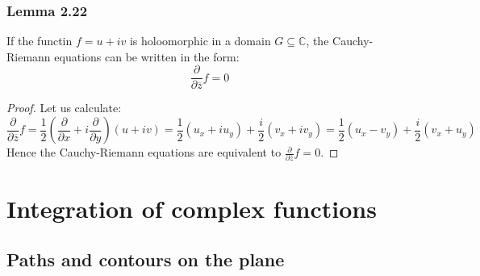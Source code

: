 \documentclass[a4paper, 12pt, twoside]{article}
\begin{document}
\subsubsection*{Lemma 2.22}
If the functin $f=u+iv$ is holoomorphic in a domain $G\subseteq \mathbb{C}$, the Cauchy-Riemann equations can be written in the form:
$$ \frac{\partial}{\partial\overline{z}}f=0$$
\begin{proof}
    Let us calculate:
    $$\frac{\partial}{\partial\overline{z}}f=\frac{1}{2}(\frac{\partial}{\partial x}+i \frac{\partial}{\partial y})(u+iv)=\frac{1}{2}(u_{x}+iu_{y})+\frac{i}{2}(v_{x}+iv_{y})= \frac{1}{2}(u_{x}-v_{y})+\frac{i}{2}(v_{x}+u_{y}) $$
    Hence the Cauchy-Riemann equations are equivalent to $\frac{\partial}{\partial\overline{z}}f=0$.
\end{proof}

\newpage
\section{Integration of complex functions}
\subsection{Paths and contours on the plane}
\end{document}
